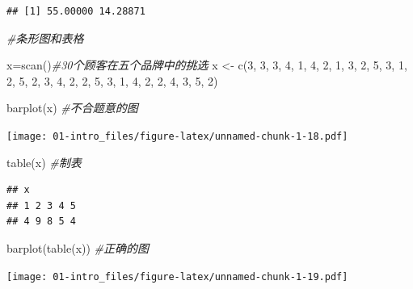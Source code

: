 \documentclass[
]{book}
\newenvironment{Shaded}{\begin{snugshade}}{\end{snugshade}}
\newcommand{\CommentTok}[1]{\textcolor[rgb]{0.56,0.35,0.01}{\textit{#1}}}
\newcommand{\DecValTok}[1]{\textcolor[rgb]{0.00,0.00,0.81}{#1}}
\newcommand{\FunctionTok}[1]{\textcolor[rgb]{0.00,0.00,0.00}{#1}}
\newcommand{\NormalTok}[1]{#1}
\newcommand{\OtherTok}[1]{\textcolor[rgb]{0.56,0.35,0.01}{#1}}
\begin{document}
\begin{verbatim}
## [1] 55.00000 14.28871
\end{verbatim}

\begin{Shaded}
\begin{Highlighting}[]
\CommentTok{\#条形图和表格}

\NormalTok{x}\OtherTok{=}\FunctionTok{scan}\NormalTok{()}\CommentTok{\#30个顾客在五个品牌中的挑选}
\NormalTok{x }\OtherTok{\textless{}{-}} \FunctionTok{c}\NormalTok{(}\DecValTok{3}\NormalTok{, }\DecValTok{3}\NormalTok{, }\DecValTok{3}\NormalTok{, }\DecValTok{4}\NormalTok{, }\DecValTok{1}\NormalTok{, }\DecValTok{4}\NormalTok{, }\DecValTok{2}\NormalTok{, }\DecValTok{1}\NormalTok{, }\DecValTok{3}\NormalTok{, }\DecValTok{2}\NormalTok{, }\DecValTok{5}\NormalTok{, }\DecValTok{3}\NormalTok{, }\DecValTok{1}\NormalTok{, }\DecValTok{2}\NormalTok{, }\DecValTok{5}\NormalTok{, }\DecValTok{2}\NormalTok{, }\DecValTok{3}\NormalTok{, }\DecValTok{4}\NormalTok{, }\DecValTok{2}\NormalTok{, }\DecValTok{2}\NormalTok{, }\DecValTok{5}\NormalTok{, }\DecValTok{3}\NormalTok{, }\DecValTok{1}\NormalTok{, }\DecValTok{4}\NormalTok{, }\DecValTok{2}\NormalTok{, }\DecValTok{2}\NormalTok{, }\DecValTok{4}\NormalTok{, }\DecValTok{3}\NormalTok{, }\DecValTok{5}\NormalTok{, }\DecValTok{2}\NormalTok{)}

\FunctionTok{barplot}\NormalTok{(x) }\CommentTok{\#不合题意的图}
\end{Highlighting}
\end{Shaded}

\texttt{[image: 01-intro\_files/figure-latex/unnamed-chunk-1-18.pdf]}

\begin{Shaded}
\begin{Highlighting}[]
\FunctionTok{table}\NormalTok{(x) }\CommentTok{\#制表}
\end{Highlighting}
\end{Shaded}

\begin{verbatim}
## x
## 1 2 3 4 5 
## 4 9 8 5 4
\end{verbatim}

\begin{Shaded}
\begin{Highlighting}[]
\FunctionTok{barplot}\NormalTok{(}\FunctionTok{table}\NormalTok{(x)) }\CommentTok{\#正确的图}
\end{Highlighting}
\end{Shaded}

\texttt{[image: 01-intro\_files/figure-latex/unnamed-chunk-1-19.pdf]}
\end{document}
